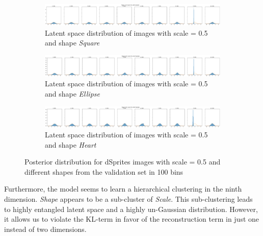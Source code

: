 \begin{figure}
    \centering
    \begin{subfigure}{\textwidth}
        \centering
        \includegraphics[width=\textwidth]{images/latent_space_entanglement/vae_dsprites_lf_10000_dist_shape_1_scale_0_5.png}
        \caption{Latent space distribution of images with scale = 0.5 and shape \textit{Square}}
    \end{subfigure}
    \begin{subfigure}{\textwidth}
        \centering
        \includegraphics[width=\textwidth]{images/latent_space_entanglement/vae_dsprites_lf_10000_dist_shape_2_scale_0_5.png}
        \caption{Latent space distribution of images with scale = 0.5 and shape \textit{Ellipse}}
    \end{subfigure}
    \begin{subfigure}{\textwidth}
        \centering
        \includegraphics[width=\textwidth]{images/latent_space_entanglement/vae_dsprites_lf_10000_dist_shape_3_scale_0_5.png}
        \caption{Latent space distribution of images with scale = 0.5 and shape \textit{Heart}}
    \end{subfigure}
    \caption[VAE Latent Space Distribution - dSprites Scale and Shapes]{Posterior distribution for dSprites images with scale = 0.5 and different shapes from the validation set in 100 bins}
    \label{fig:10000_vae_latent_space_distribution_scales_and_shapes}
\end{figure}

Furthermore, the model seems to learn a hierarchical clustering in the ninth dimension.
\textit{Shape} appears to be a sub-cluster of \textit{Scale}.
This sub-clustering leads to highly entangled latent space and a highly un-Gaussian distribution.
However, it allows us to violate the \ac{KL}-term in favor of the reconstruction term in just one instead of two dimensions.

